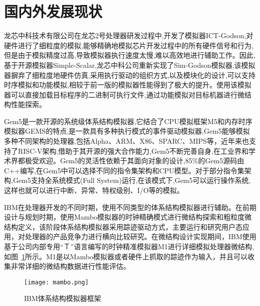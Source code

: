\section{国内外发展现状}
龙芯中科技术有限公司在龙芯2号处理器研发过程中,开发了模拟器ICT-Godson\cite{gao2007simos},对硬件进行了细粒度的模拟,能够精确地模拟芯片开发过程中的所有硬件信号和行为,但是由于模拟精度过高,导致模拟器执行速度太慢,难以高效地进行辅助工作。因此,基于开源模拟器Simple-Scalar\cite{austin2002simplescalar},龙芯中科公司重新实现了Sim-Godson模拟器\cite{zhang2007sim},该模拟器摒弃了细粒度地硬件仿真,采用执行驱动的组织方式,以及模块化的设计,可以支持时序模拟和功能模拟\cite{zhang2007sim},相较于前一版的模拟器性能得到了极大的提升。使用该模拟器可以直接加载目标程序的二进制可执行文件,通过功能模拟对目标机器进行微结构性能探索\cite{desikan2001sim}。

Gem5是一款开源的系统级体系结构模拟器,它结合了CPU模拟框架M5和内存时序模拟器GEMS的特点,是一款具有多种执行模式的事件驱动模拟器\cite{许鹏2006一种应用于嵌入式系统中断控制},Gem5能够模拟多种不同架构的处理器,包括Alpha、ARM、X86、SPARC、MIPS等，近年来也支持了RISC-V架构,借助于其开源的强大合作能力,Gem5不断完善自身,在工业界和学术界都极受欢迎。Gem5的灵活性依赖于其面向对象的设计,85\%的Gem5源码由C++编写,在Gem5中可以选择不同的指令集架构和CPU模型。对于部分指令集架构,Gem5支持全系统模式(Full System)运行,在该模式下,Gem5可以运行操作系统,这样也就可以进行中断、异常、特权级别、I/O等的模拟。


IBM在处理器开发的不同时期，使用不同类型的体系结构模拟器进行辅助。在前期设计与规划时期，使用Mambo\cite{boh}模拟器的时钟精确模式进行微结构探索和粗粒度微结构定义，该阶段体系结构模拟器采用踪迹驱动方式\cite{ceze2003full}，主要运行和研究用户态应用，对处理器的产品竞争力进行横向比较研究\cite{kistlerexperiences}。在微结构设计实现期间，IBM使用基于公司内部专用“Ｔ”语言\cite{asaad2012cycle,chaix2019implementation}编写的时钟精准模拟器M1进行详细模拟处理器微结构\cite{kistlerexperiences},如图~\ref{fig:IBM}所示。M1是以Mambo模拟器或者硬件上抓取的踪迹作为输入，并且可以收集非常详细的微结构数据进行性能评估\cite{magnusson2002simics}。
\begin{figure}[h]
  \centering
  \texttt{[image: mambo.png]}
  \caption{IBM体系结构模拟器框架}
  \label{fig:IBM}
\end{figure}  


